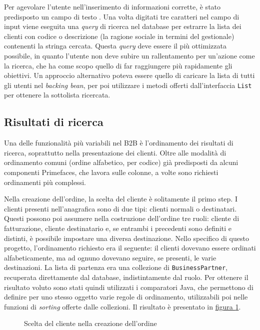 Per agevolare l'utente nell'inserimento di informazioni corrette, è stato predisposto un campo di testo . Una volta digitati tre caratteri nel campo di input viene eseguita una \textit{query} di ricerca nel database per estrarre la lista dei clienti con codice o descrizione (la ragione sociale in termini del gestionale) contenenti la stringa cercata. Questa \textit{query} deve essere il più ottimizzata possibile, in quanto l'utente non deve subire un rallentamento per un'azione come la ricerca, che ha come scopo quello di far raggiungere più rapidamente gli obiettivi. Un approccio alternativo poteva essere quello di caricare la lista di tutti gli utenti nel \textit{backing bean}, per poi utilizzare i metodi offerti dall'interfaccia \texttt{List} per ottenere la sottolista ricercata.

\subsection{Risultati di ricerca}
Una delle funzionalità più variabili nel B2B è l'ordinamento dei risultati di ricerca, soprattutto nella presentazione dei clienti. Oltre alle modalità di ordinamento comuni (ordine alfabetico, per codice) già predisposti da alcuni componenti Primefaces, che lavora sulle colonne, a volte sono richiesti ordinamenti più complessi.

Nella creazione dell'ordine, la scelta del cliente è solitamente il primo step. I clienti presenti nell'anagrafica sono di due tipi: clienti normali o destinatari. Questi possono poi assumere nella costruzione dell'ordine tre ruoli: cliente di fatturazione, cliente destinatario e, se entrambi i precedenti sono definiti e distinti, è possibile impostare una diversa destinazione. Nello specifico di questo progetto, l'ordinamento richiesto era il seguente: il clienti dovevano essere ordinati alfabeticamente, ma ad ognuno dovevano seguire, se presenti, le varie destinazioni. La lista di partenza era una collezione di \texttt{BusinessPartner}, recuperata direttamente dal database, indistintamente dal ruolo. Per ottenere il risultato voluto sono stati quindi utilizzati i comparatori Java, che permettono di definire per uno stesso oggetto varie regole di ordinamento, utilizzabili poi nelle funzioni di \textit{sorting} offerte dalle collezioni. Il risultato è presentato in \hyperref[fig:listaclienti]{figura \ref{fig:listaclienti}}.
\begin{figure}
	\centering
	\caption{Scelta del cliente nella creazione dell'ordine}
	\label{fig:listaclienti}
\end{figure}

